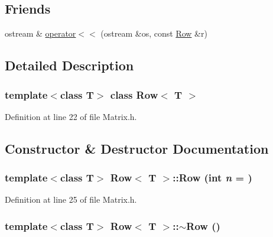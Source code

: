 \subsection*{Friends}
\begin{DoxyCompactItemize}
\item 
ostream \& \hyperlink{classRow_a8aaaee73ace04bfd4dda937bc311a16e}{operator$<$$<$} (ostream \&os, const \hyperlink{classRow}{Row} \&r)
\end{DoxyCompactItemize}


\subsection{Detailed Description}
\subsubsection*{template$<$class T$>$ class Row$<$ T $>$}



Definition at line 22 of file Matrix.h.



\subsection{Constructor \& Destructor Documentation}
\hypertarget{classRow_aad13a5275c04ed243620bb02164806a1}{
\subsubsection[{Row}]{\setlength{\rightskip}{0pt plus 5cm}template$<$class T$>$ {\bf Row}$<$ T $>$::{\bf Row} (int {\em n} = {})}}
\label{classRow_aad13a5275c04ed243620bb02164806a1}


Definition at line 25 of file Matrix.h.

\hypertarget{classRow_a8e888a33060156cd2e3757a95e9feee1}{
\subsubsection[{$\sim$Row}]{\setlength{\rightskip}{0pt plus 5cm}template$<$class T$>$ {\bf Row}$<$ T $>$::$\sim${\bf Row} ()}}
\label{classRow_a8e888a33060156cd2e3757a95e9feee1}


